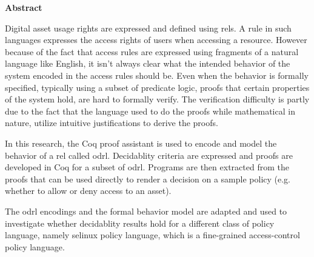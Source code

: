 
\begin{center}\textbf{Abstract}\end{center}


Digital asset usage rights are expressed and defined using \ac{rel}s. A rule in such languages expresses the access rights of users when accessing a resource. However because of the fact that access rules are expressed using fragments of a natural language like English, it isn't always clear what the intended behavior of the system encoded in the access rules should be. Even when the behavior is formally specified, typically using a subset of predicate logic, proofs that certain properties of the system hold, are hard to formally verify. The verification difficulty is partly due to the fact that the language used to do the proofs while mathematical in nature, utilize intuitive justifications to derive the proofs. 

In this research, the Coq proof assistant is used to encode and model the behavior of a \ac{rel} called \ac{odrl}. Decidablity criteria are expressed and proofs are developed in Coq for a subset of \ac{odrl}. Programs are then extracted from the proofs that can be used directly to render a decision on a sample policy (e.g. whether to allow or deny access to an asset). 

The \ac{odrl} encodings and the formal behavior model are adapted and used to investigate whether decidablity results hold for a different class of policy language, namely \ac{selinux} policy language, which is a fine-grained access-control policy language.


\cleardoublepage
